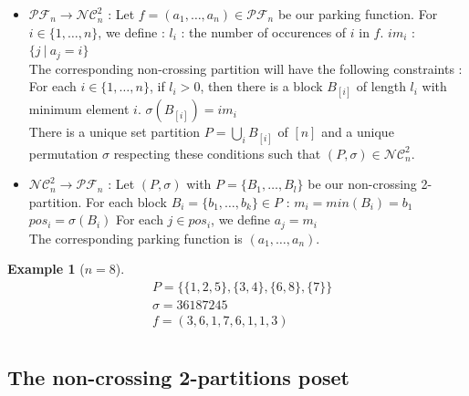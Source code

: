 \documentclass[12pt]{report}
\newtheorem*{example}{Example}
\begin{document}
\begin{itemize}
    \item $\mathcal{PF}_n \to \mathcal{NC}^2_n$ :
    Let $f = (a_1, \ldots, a_n) \in \mathcal{PF}_n$
    be our parking function.
    For $i \in \{1, \ldots, n\}$, we define :
        \subitem $l_i$ : the number of occurences of $i$ in $f$. 
        \subitem $im_i$ : $\{j\ |\ a_j = i\}$\\
    The corresponding non-crossing partition will
    have the following constraints :
        \subitem For each $i \in \{1, \ldots, n\}$, if $l_i > 0$,
        then there is a block $B_{[i]}$ of length
        \subitem $l_i$ with minimum element $i$.
        \subitem $\sigma (B_{[i]}) = im_i$\\
    There is a unique set partition
    $\displaystyle P = \bigcup_{i}{B}_{[i]}$ of $[n]$
    and a unique permutation $\sigma$ respecting these
    conditions such that $(P, \sigma) \in \mathcal{NC}^2_n$.
    \item $\mathcal{NC}^2_n \to \mathcal{PF}_n$ :
    Let $(P, \sigma)$ with $P = \{B_1, \ldots, B_l\}$ be our
    non-crossing 2-partition.
    For each block $B_i = \{b_1, \ldots, b_k\} \in P$ :
    \subitem $m_i = min (B_i) = b_1$
    \subitem $pos_i = \sigma (B_i)$
    \subitem For each $j \in pos_i$, we define $a_j = m_i$\\
    The corresponding parking function is $(a_1, \ldots, a_n)$.
\end{itemize}

\begin{example}[$n = 8$]
    \begin{align*}
        &P = \{\{1, 2, 5\}, \{3, 4\}, \{6, 8\}, \{7\}\}\\
        &\sigma = 36187245\\
        &f = (3, 6, 1, 7, 6, 1, 1, 3)\\
    \end{align*}
\end{example}

\subsection{The non-crossing 2-partitions poset}
\end{document}
